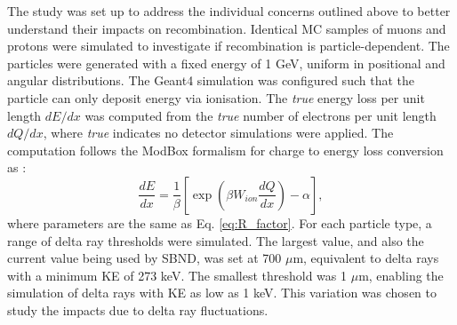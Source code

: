 The study was set up to address the individual concerns outlined above to better understand their impacts on recombination.
Identical MC samples of muons and protons were simulated to investigate if recombination is particle-dependent.
The particles were generated with a fixed energy of 1 GeV, uniform in positional and angular distributions.
The Geant4 simulation was configured such that the particle can only deposit energy via ionisation.
The \textit{true} energy loss per unit length $dE/dx$ was computed from the \textit{true} number of electrons per unit length $dQ/dx$, where \textit{true} indicates no detector simulations were applied. 
The computation follows the ModBox formalism for charge to energy loss conversion as \cite{argoneut_recomb}:
\begin{equation}
        \label{eq:recomb_modbox}
        \frac{dE}{dx} = \frac{1}{\beta}\left[ \exp{\left( \beta W_{ion}  \frac{dQ}{dx}\right)} -\alpha \right],
\end{equation}
where parameters are the same as Eq. \ref{eq:R_factor}.
For each particle type, a range of delta ray thresholds were simulated.
The largest value, and also the current value being used by SBND, was set at 700 $\mu$m, equivalent to delta rays with a minimum KE of 273 keV.
The smallest threshold was 1 $\mu$m, enabling the simulation of delta rays with KE as low as 1 keV.
This variation was chosen to study the impacts due to delta ray fluctuations.


%

